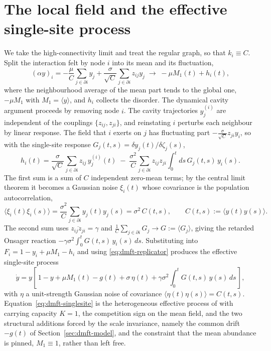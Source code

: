 \section{The local field and the effective single-site process}
\label{sec:dmft-cavity}

We take the high-connectivity limit and treat the regular graph, so that
$k_i \equiv C$. Split the interaction felt by node $i$ into its mean and
its fluctuation,
\begin{equation}
    (\alpha y)_i
    = -\frac{\mu}{C}\sum_{j\in\partial i} y_j + \frac{\sigma}{\sqrt C}\sum_{j\in\partial i} z_{ij} y_j
    \;\longrightarrow\; -\mu M_1(t) + h_i(t),
\end{equation}
where the neighbourhood average of the mean part tends to the global one, $-\mu M_1$ with
$M_1 = \langle y\rangle$, and $h_i$ collects the disorder. The dynamical cavity argument
\citep{bunin2017,galla2018} proceeds by removing node $i$. The cavity trajectories
$y_j^{(i)}$ are independent of the couplings $\{z_{ij}, z_{ji}\}$, and reinstating $i$
perturbs each neighbour by linear response. The field that $i$ exerts on $j$ has
fluctuating part $-\frac{\sigma}{\sqrt C} z_{ji} y_i$, so with the single-site response
$G_j(t,s) = \delta y_j(t)/\delta\zeta_j(s)$,
\begin{equation}
    h_i(t)
    = \frac{\sigma}{\sqrt C}\sum_{j\in\partial i} z_{ij}\,y_j^{(i)}(t)
    \;-\; \frac{\sigma^2}{C}\sum_{j\in\partial i} z_{ij}z_{ji}\!\int_0^t\! ds\,G_j(t,s)\,y_i(s).
\end{equation}
The first sum is a sum of $C$ independent zero-mean terms; by the central limit theorem it
becomes a Gaussian noise $\xi_i(t)$ whose covariance is the population autocorrelation,
\begin{equation}
    \langle\xi_i(t)\xi_i(s)\rangle
    = \frac{\sigma^2}{C}\sum_{j\in\partial i} y_j(t)y_j(s)
    = \sigma^2\,C(t,s),\qquad C(t,s):=\langle y(t)y(s)\rangle .
\end{equation}
The second sum uses $\overline{z_{ij}z_{ji}} = \gamma$ and
$\frac1C\sum_{j\in\partial i} G_j \to G := \langle G_j\rangle$, giving the retarded Onsager
reaction $-\gamma\sigma^2\!\int_0^t G(t,s)\,y_i(s)\,ds$. Substituting into $F_i = 1 - y_i +
\mu M_1 - h_i$ and using \eqref{eq:dmft-replicator} produces the effective single-site
process
\begin{equation}
    \boxed{\;
    \dot y = y\left[\,1 - y + \mu M_1(t) - g(t)
        + \sigma\,\eta(t) + \gamma\sigma^2\!\int_0^t\! G(t,s)\,y(s)\,ds\,\right],
    \;}
    \label{eq:dmft-singlesite}
\end{equation}
with $\eta$ a unit-strength Gaussian noise of covariance $\langle\eta(t)\eta(s)\rangle =
C(t,s)$. Equation~\eqref{eq:dmft-singlesite} is the heterogeneous effective process of
\citet{aguirrelopez} with carrying capacity $K=1$, the competition sign on the mean field,
and the two structural additions forced by the scale invariance, namely the common drift $-g(t)$
of Section~\ref{sec:dmft-model}, and the constraint that the mean abundance is pinned,
$M_1\equiv 1$, rather than left free.

